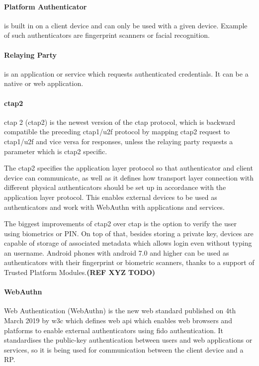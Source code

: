 \paragraph{Platform Authenticator} 
is built in on a client device and can only be used with a given device. Example of such authenticators are fingerprint scanners or facial recognition.

\paragraph{Relaying Party} 
is an application or service which requests authenticated credentials. It can be a native or web application.

\paragraph{\acrshort{ctap}2}
\acrlong{ctap} 2 (\acrshort{ctap}2) is the newest version of the \acrshort{ctap} protocol, which is backward compatible the preceding \acrshort{ctap}1/\acrshort{u2f} protocol by mapping \acrshort{ctap}2 request to \acrshort{ctap}1/\acrshort{u2f} and vice versa for responses, unless the relaying party requests a parameter which is \acrshort{ctap}2 specific. 

The \acrshort{ctap}2 specifies the application layer protocol so that authenticator and client device can communicate, as well as it defines how transport layer connection with different physical authenticators should be set up in accordance with the application layer protocol. This enables external devices to be used as authenticators and work with WebAuthn with applications and services.

The biggest improvements of \acrshort{ctap}2 over \acrshort{ctap} is the option to verify the user using biometrics or PIN. On top of that, besides storing a private key, devices are capable of storage of associated metadata which allows login even without typing an username. Android phones with android 7.0 and higher can be used as authenticators with their fingerprint or biometric scanners, thanks to a support of Trusted Platform Modules.\textbf{(REF XYZ TODO)}

\paragraph{WebAuthn} 
Web Authentication (WebAuthn) is the new web standard published on 4th March 2019  by \acrshort{w3c} which defines web \acrshort{api} which enables web browsers and platforms to enable external authenticators using \acrshort{fido} authentication. It standardises the public-key authentication between users and web applications or services, so it is being used for communication between the client device and a RP.

